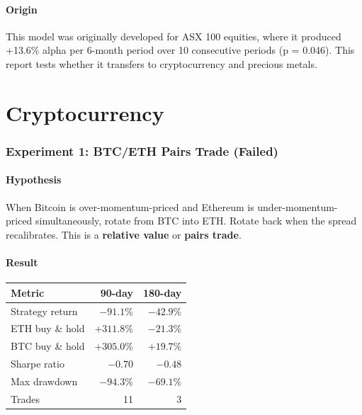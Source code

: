 \documentclass[11pt,a4paper]{article}
\begin{document}
\subsection{Origin}

This model was originally developed for ASX 100 equities, where it
produced +13.6\% alpha per 6-month period over 10 consecutive periods
(p = 0.046). This report tests whether it transfers to cryptocurrency
and precious metals.

\newpage


\part{Cryptocurrency}

\section{Experiment 1: BTC/ETH Pairs Trade (Failed)}

\subsection{Hypothesis}

When Bitcoin is over-momentum-priced and Ethereum is
under-momentum-priced simultaneously, rotate from BTC into ETH.
Rotate back when the spread recalibrates. This is a
\textbf{relative value} or \textbf{pairs trade}.

\subsection{Result}

\begin{tabular}{@{}lrr@{}}
    \toprule
    \textbf{Metric} & \textbf{90-day} & \textbf{180-day} \\
    \midrule
    Strategy return    & $-91.1\%$  & $-42.9\%$  \\
    ETH buy \& hold    & $+311.8\%$ & $-21.3\%$  \\
    BTC buy \& hold    & $+305.0\%$ & $+19.7\%$  \\
    Sharpe ratio       & $-0.70$    & $-0.48$    \\
    Max drawdown       & $-94.3\%$  & $-69.1\%$  \\
    Trades             & 11         & 3          \\
    \bottomrule
\end{tabular}
\end{document}
